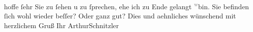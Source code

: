 \begin{ledgroupsized}[t]{13cm}
                    hoffe ſehr Sie zu ſehen u zu ſprechen, ehe ich zu Ende gelangt \substVorne{}\textsuperscript{\textcolor{gray}{w}}\substDazwischen{}bin\substHinten{}. Sie befinden ſich wohl wieder beſſer? Oder ganz gut? Dies und
                    aehnliches wünschend mit herzlichem Gruß Ihr\pend
           \pstart \spacefill\mbox{ArthurSchnitzler}\pend{}\endnumbering{}\end{ledgroupsized}  \newcommand{\dateiname}{L02245}\newcommand{\titel}{Arthur Schnitzler an Robert Adam, 16. 11. 1916}\newcommand{\editorInnen}{Martin Anton Müller und Gerd-Hermann Susen}
      